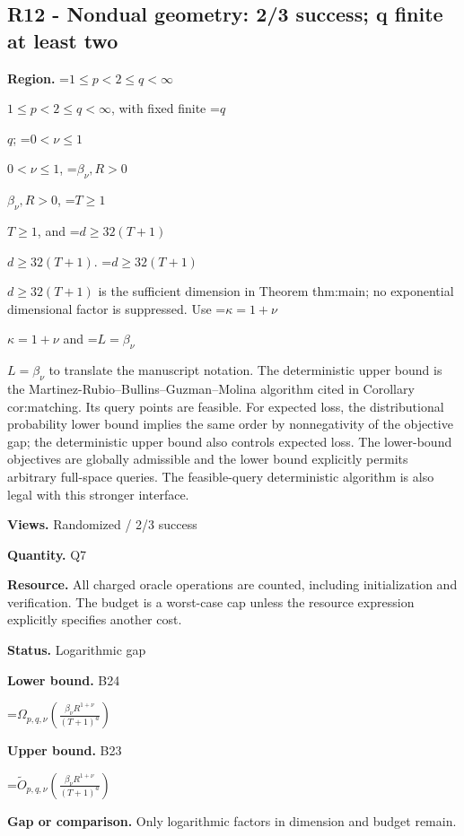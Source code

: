 \documentclass[10pt,a4paper]{article}
\newcommand{\AtlasMath}[1]{\par\begingroup\centering\setbox0=\hbox{$\displaystyle #1$}\ifdim\wd0>1.4\linewidth\typeout{ATLAS WIDE FORMULA: \the\wd0}\fi\ifdim\wd0>\linewidth\resizebox{\linewidth}{!}{\box0}\else\box0\fi\par\endgroup}
\newcommand{\AtlasInlineMath}[1]{\begingroup\setbox0=\hbox{$#1$}\ifdim\wd0>.4\linewidth\endgroup\AtlasMath{#1}\else\endgroup$#1$\fi}
\begin{document}
\subsection{R12 - Nondual geometry: 2/3 success; q finite at least two}


\textbf{Region.} \AtlasInlineMath{1\le p<2\le q<\infty}, with fixed finite \AtlasInlineMath{q}; \AtlasInlineMath{0<\nu\le1}, \AtlasInlineMath{\beta_\nu,R>0}, \AtlasInlineMath{T\ge1}, and \AtlasInlineMath{d\ge32(T+1)}. \AtlasInlineMath{d\ge32(T+1)} is the sufficient dimension in Theorem thm:main; no exponential dimensional factor is suppressed. Use \AtlasInlineMath{\kappa=1+\nu} and \AtlasInlineMath{L=\beta_\nu} to translate the manuscript notation. The deterministic upper bound is the Martinez-Rubio--Bullins--Guzman--Molina algorithm cited in Corollary cor:matching. Its query points are feasible. For expected loss, the distributional probability lower bound implies the same order by nonnegativity of the objective gap; the deterministic upper bound also controls expected loss. The lower-bound objectives are globally admissible and the lower bound explicitly permits arbitrary full-space queries. The feasible-query deterministic algorithm is also legal with this stronger interface.



\textbf{Views.} Randomized / 2/3 success



\textbf{Quantity.} Q7



\textbf{Resource.} All charged oracle operations are counted, including initialization and verification. The budget is a worst-case cap unless the resource expression explicitly specifies another cost.



\textbf{Status.} Logarithmic gap



\textbf{Lower bound.} B24



\AtlasMath{\Omega_{p,q,\nu}\!\left(\frac{\beta_\nu R^{1+\nu}}{(T+1)^a}\right)}


\textbf{Upper bound.} B23



\AtlasMath{\widetilde O_{p,q,\nu}\!\left(\frac{\beta_\nu R^{1+\nu}}{(T+1)^a}\right)}


\textbf{Gap or comparison.} Only logarithmic factors in dimension and budget remain.
\end{document}
